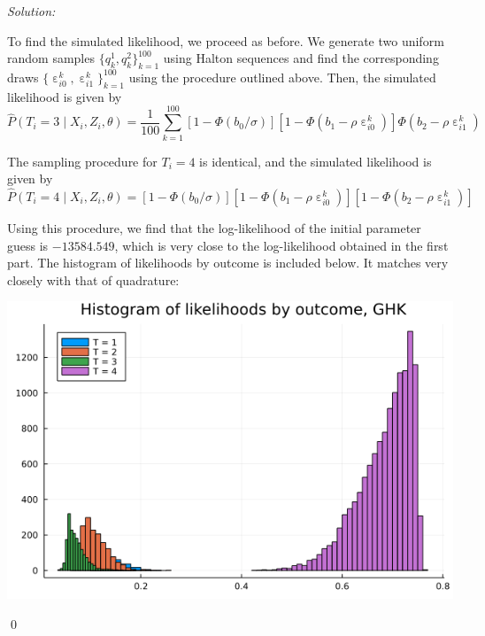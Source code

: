 \documentclass[12pt]{article}
\DeclareMathOperator{\eps}{\varepsilon}
\newenvironment{problem}[2][Problem]{\begin{trivlist}
\item[\hskip \labelsep {\bfseries #1}\hskip \labelsep {\bfseries #2.}]}{\end{trivlist}}
\newenvironment{sol}
    {\emph{Solution:}
    }
    {
    \qed
    }
\begin{document}
\begin{sol}
    To find the simulated likelihood, we proceed as before. We generate two uniform random samples $\{q_k^1, q_k^2\}_{k=1}^{100}$ using Halton sequences and find the corresponding draws $\{\eps_{i0}^k, \eps_{i1}^k\}_{k=1}^{100}$ using the procedure outlined above. Then, the simulated likelihood is given by
    \[\hat{P}(T_i = 3 \mid X_i, Z_i, \theta) = \frac{1}{100} \sum_{k=1}^{100} [1-\Phi(b_0/\sigma)] [1 - \Phi(b_1 - \rho \eps_{i0}^k)] \Phi(b_2 - \rho \eps_{i1}^k)\]

    The sampling procedure for $T_i = 4$ is identical, and the simulated likelihood is given by
    \[\hat{P}(T_i = 4 \mid X_i, Z_i, \theta) =[1-\Phi(b_0/\sigma)] [1 - \Phi(b_1 - \rho \eps_{i0}^k)] [1 -\Phi(b_2 - \rho \eps_{i1}^k)]\]

    Using this procedure, we find that the log-likelihood of the initial parameter guess is $-13584.549$, which is very close to the log-likelihood obtained in the first part. The histogram of likelihoods by outcome is included below. It matches very closely with that of quadrature:
    \begin{center}
        \includegraphics[scale=0.5]{GHK_ll.png}
    \end{center}
\end{sol}
\begin{problem}{3}
\end{problem}
\end{document}
